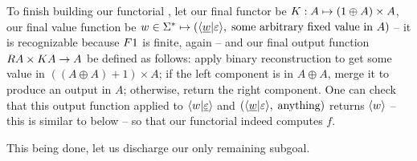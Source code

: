 To finish building our functorial \sst, let our final functor be $\functork : A \mapsto (1 \oplus A)\times A$, our final value function be $w\in\Sigma^* \mapsto (\langle \underline{w}|\varepsilon \rangle,\;\text{some arbitrary fixed value in}\ A)$ -- it is recognizable because $\functor1$ is finite, again -- and our final output function $\functorr A \times \functork A \to A$ be defined as follows: apply binary reconstruction to get some value in $((A\oplus A)+1)\times A$; if the left component is in $A\oplus A$, merge it to produce an output in $A$; otherwise, return the right component. One can check that this output function applied to $\langle w|\underline\varepsilon \rangle$ and $(\langle \underline{w}|\varepsilon \rangle,\;\text{anything})$ returns $\langle w \rangle$ -- this is similar to  below -- so that our functorial \sst indeed computes $f$.

This being done, let us discharge our only remaining subgoal.

